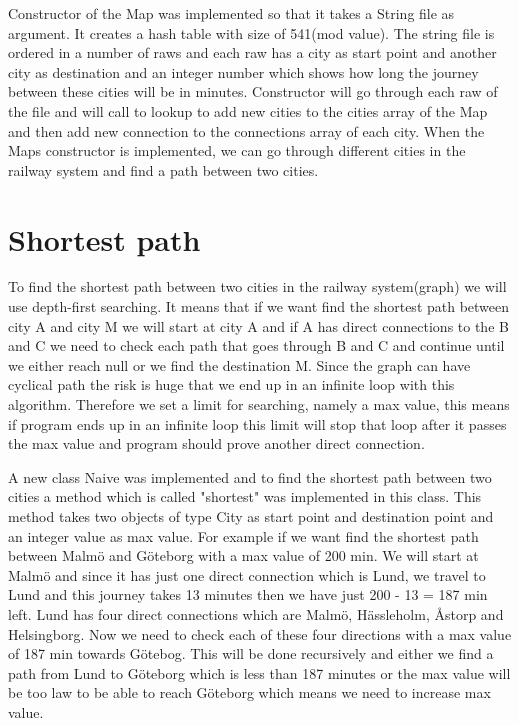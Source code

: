 \documentclass[a4paper,11pt]{article}
\begin{document}
Constructor of the Map was implemented so that it takes a String file as argument. It creates a hash table with size of 541(mod value). The string file is ordered in a number of raws and each raw has a city as start point and another city as destination and an integer number which shows how long the journey between these cities will be in minutes. Constructor will go through each raw of the file and will call to lookup to add new cities to the cities array of the Map and then add new connection to the connections array of each city. When the Maps constructor is implemented, we can go through different cities in the railway system and find a path between two cities.\newline       

\section*{Shortest path}
To find the shortest path between two cities in the railway system(graph) we will use depth-first searching. It means that if we want find the shortest path between city A and city M we will start at city A and if A has direct connections to the B and C we need to check each path that goes through B and C and continue until we either reach null or we find the destination M. Since the graph can have cyclical path the risk is huge that we end up in an infinite loop with this algorithm. Therefore we set a limit for searching, namely a max value, this means if program ends up in an infinite loop this limit will stop that loop after it passes the max value and program should prove another direct connection.\newline

A new class Naive was implemented and to find the shortest path between two cities a method which is called "shortest" was implemented in this class. This method takes two objects of type City as start point and destination point and an integer value as max value. For example if we want find the shortest path between Malmö and Göteborg with a max value of 200 min. We will start at Malmö and since it has just one direct connection which is Lund, we travel to Lund and this journey takes 13 minutes then we have just 200 - 13 = 187 min left. Lund has four direct connections which are Malmö, Hässleholm, Åstorp and Helsingborg. Now we need to check each of these four directions with a max value of 187 min towards Götebog. This will be done recursively and either we find a path from Lund to Göteborg which is less than 187 minutes or the max value will be too law to be able to reach Göteborg which means we need to increase max value.\newline
\end{document}
